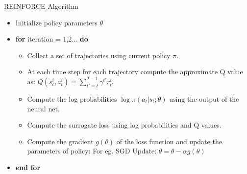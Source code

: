 \begin{frame}{REINFORCE Algorithm}
    \begin{itemize}
        \item[] Initialize policy parameters $\theta$
        \item[] \textbf{for} iteration = 1,2... \textbf{do} 
        \begin{itemize}
            \item[] Collect a set of trajectories using current policy $\pi$.
            \item[] At each time step for each trajectory compute the approximate Q value as: $Q(s_t^i, a_t^i) = \sum_{t' = t}^{T-1}\gamma^{t'}r_{t'}^i$
            \item[] Compute the log probabilities $\log\pi(a_t|s_t;\theta)$ using the output of the neural net.
            \item[] Compute the surrogate loss using log probabilities and Q values.
            \item[] Compute the gradient $g(\theta)$  of the loss function and update the parameters of policy: For eg. SGD Update: $\theta = \theta - \alpha g(\theta)$
        \end{itemize}
        \item[] \textbf{end for}
    \end{itemize}
\end{frame}
